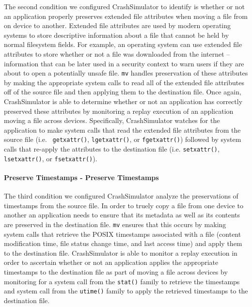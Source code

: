 The second condition we configured CrashSimulator to identify is whether or not
an application properly preserves extended file attributes when moving a file
from on device to another.  Extended file attributes are used by modern
operating systems to store descriptive information about a file that cannot be
held by normal filesystem fields.  For example, an operating system can use
extended file attributes to store whether or not a file was downloaded from the
internet -- information that can be later used in a security context to warn
users if they are about to open a potentially unsafe file.  {\tt mv} handles
preservation of these attributes by making the appropriate system calls to read
all of the extended file attributes off of the source file and then applying
them to the destination file.  Once again, CrashSimulator is able to determine
whether or not an application has correctly preserved these attributes by
monitoring a replay execution of an application moving a file across devices.
Specifically, CrashSimulator watches for the application to make system calls
that read the extended file attributes from the source file (i.e. {\tt
  getxattr()}, {\tt lgetxattr()}, or {\tt fgetxattr()}) followed by system calls
that re-apply the attributes to the destination file (i.e. {\tt setxattr()},
{\tt lsetxattr()}, or {\tt fsetxattr()}).

\paragraph{Preserve Timestamps - Preserve Timestamps}

The third condition we configured CrashSimulator analyze the preservations of
timestamps from the source file. In order to truely copy a file from one device
to another an application needs to ensure that its metadata as well as its
contents are preserved in the destination file.  {\tt mv} ensures that this
occurs by making system calls that retrieve the POSIX timestamps associated with
a file (content modification time, file status change time, and last access
time) and apply them to the destination file.  CrashSimulator is able to monitor
a replay execution in order to ascertain whether or not an application applies
the appropriate timestamps to the destination file as part of moving a file
across devices by monitoring for a system call from the {\tt stat()} family to
retrieve the timestamps and system call from the {\tt utime()} family to apply
the retrieved timestamps to the destination file.

